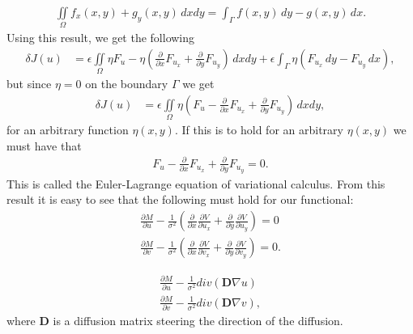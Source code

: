 \documentclass[10pt,a4paper]{article}
\begin{document}
\begin{align*}
\iint \limits_\Omega f_x(x,y) + g_y(x,y) \, dx dy = \int_\Gamma f(x,y) \, dy - g(x,y) \, dx. 
\end{align*}
Using this result, we get the following
\begin{align*}
\delta J(u) &= \epsilon \iint \limits_{\Omega} \eta F_u - \eta \left( \frac{\partial}{\partial x} F_{u_x} + \frac{\partial }{\partial y} F_{u_y} \right) \, dxdy + \epsilon \int_\Gamma \eta (F_{u_x} \, dy - F_{u_y} \, dx),
\end{align*}
but since $\eta = 0$ on the boundary $\Gamma$ we get
\begin{align*}
\delta J(u) &= \epsilon \iint \limits_{\Omega} \eta \left( F_u - \frac{\partial}{\partial x} F_{u_x} + \frac{\partial }{\partial y} F_{u_y} \right) \, dxdy,
\end{align*}
for an arbitrary function $\eta(x,y)$. If this is to hold for an arbitrary $\eta(x,y)$ we must have that 
\begin{align*}
F_u - \frac{\partial}{\partial x} F_{u_x} + \frac{\partial }{\partial y} F_{u_y} = 0.
\end{align*}
This is called the Euler-Lagrange equation of variational calculus. From this result it is easy to see that the following must hold for our functional:
\begin{equation}
\label{EL}
  \begin{aligned}
\frac{\partial M}{\partial u} - \frac{1}{\sigma^2}(\frac{\partial}{\partial x} \frac{\partial V}{\partial u_x} + \frac{\partial}{\partial y} \frac{\partial V}{\partial u_y} ) = 0 \\
\frac{\partial M}{\partial v} - \frac{1}{\sigma^2}(\frac{\partial}{\partial x} \frac{\partial V}{\partial v_x} + \frac{\partial}{\partial y} \frac{\partial V}{\partial v_y} ) = 0.
  \end{aligned}
\end{equation}




\begin{equation}
\label{EL_regu}
  \begin{aligned}
\frac{\partial M}{\partial u} - \frac{1}{\sigma^2} div(\textbf{D} \nabla u) \\
\frac{\partial M}{\partial v} - \frac{1}{\sigma^2} div(\textbf{D} \nabla v),
  \end{aligned}
\end{equation}
where \textbf{D} is a diffusion matrix steering the direction of the diffusion.
\end{document}
